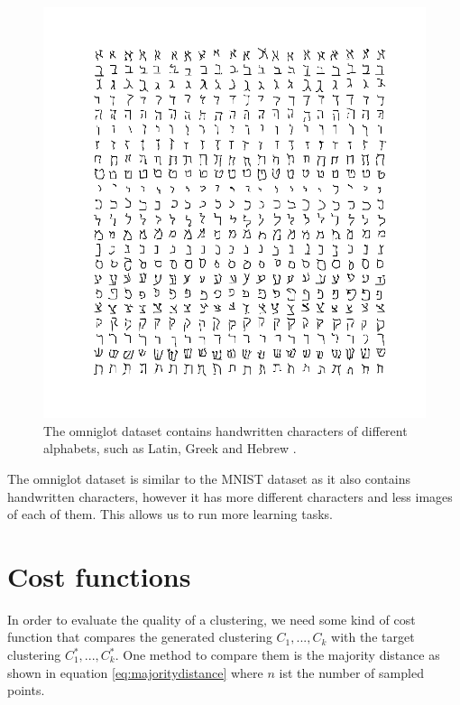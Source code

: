 \begin{figure}[h]
\begin{minipage}{.3\textwidth}
\end{minipage}
\begin{minipage}{.3\textwidth}
  \centering
  \includegraphics[width=\linewidth]{images/hebrew}
\end{minipage}
\caption{The omniglot dataset contains handwritten characters of different alphabets, such as Latin, Greek and Hebrew \cite{Lake1332}.}
\label{fig:omniglotcharacters}
\end{figure}

The omniglot dataset is similar to the MNIST dataset as it also contains handwritten characters, however it has more different characters and less images of each of them. This allows us to run more learning tasks.

\section{Cost functions}
\label{chapter:costfunctions}

In order to evaluate the quality of a clustering, we need some kind of cost function that compares the generated clustering $C_1,...,C_k$ with the target clustering $C_1^*, ..., C_k^*$. One method to compare them is the majority distance as shown in equation \ref{eq:majoritydistance} where $n$ ist the number of sampled points.

